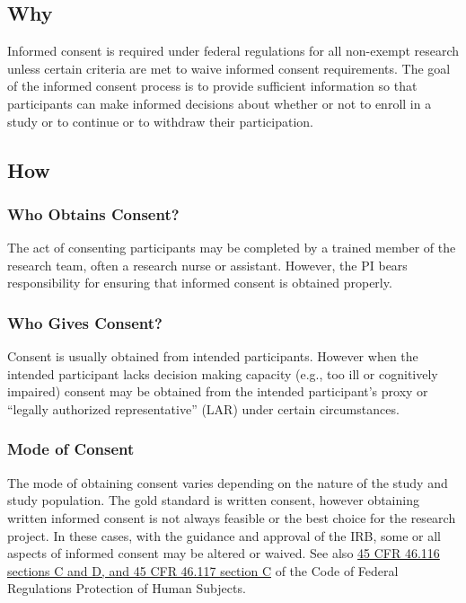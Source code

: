 \documentclass[]{book}
\theoremstyle{definition}
\theoremstyle{definition}
\theoremstyle{definition}
\theoremstyle{remark}
\begin{document}
\subsection{Why}\label{why-10}

Informed consent is required under federal regulations for all
non-exempt research unless certain criteria are met to waive informed
consent requirements. The goal of the informed consent process is to
provide sufficient information so that participants can make informed
decisions about whether or not to enroll in a study or to continue or to
withdraw their participation.

\subsection{How}\label{how-10}

\subsubsection{Who Obtains Consent?}\label{who-obtains-consent}

The act of consenting participants may be completed by a trained member
of the research team, often a research nurse or assistant. However, the
PI bears responsibility for ensuring that informed consent is obtained
properly.

\subsubsection{Who Gives Consent?}\label{who-gives-consent}

Consent is usually obtained from intended participants. However when the
intended participant lacks decision making capacity (e.g., too ill or
cognitively impaired) consent may be obtained from the intended
participant's proxy or ``legally authorized representative'' (LAR) under
certain circumstances.

\subsubsection{Mode of Consent}\label{mode-of-consent}

The mode of obtaining consent varies depending on the nature of the
study and study population. The gold standard is written consent,
however obtaining written informed consent is not always feasible or the
best choice for the research project. In these cases, with the guidance
and approval of the IRB, some or all aspects of informed consent may be
altered or waived. See also
\href{http://www.hhs.gov/ohrp/regulations-and-policy/regulations/45-cfr-46/index.html}{45
CFR 46.116 sections C and D, and 45 CFR 46.117 section C} of the Code of
Federal Regulations Protection of Human Subjects.
\end{document}
